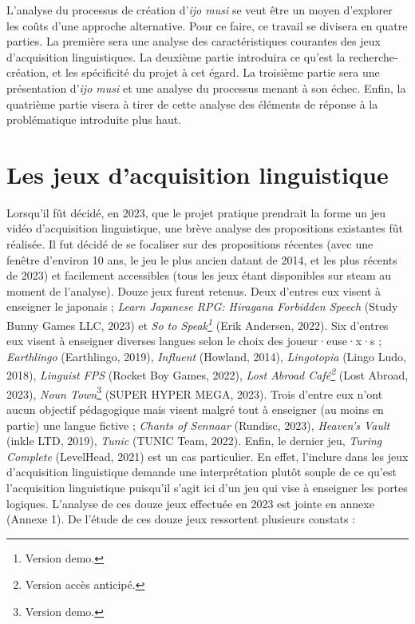 \documentclass{scrartcl}
\begin{document}
	L'analyse du processus de création d'\textit{ijo musi} se veut être un moyen d'explorer les coûts d'une approche alternative. Pour ce faire, ce travail se divisera en quatre parties. La première sera une analyse des caractéristiques courantes des jeux d'acquisition linguistiques. La deuxième partie introduira ce qu'est la recherche-création, et les spécificité du projet à cet égard. La troisième partie sera une présentation d'\textit{ijo musi} et une analyse du processus menant à son échec. Enfin, la quatrième partie visera à tirer de cette analyse des éléments de réponse à la problématique introduite plus haut.
	
	
	\section{Les jeux d'acquisition linguistique}
	Lorsqu'il fût décidé, en 2023, que le projet pratique prendrait la forme un jeu vidéo d'acquisition linguistique, une brève analyse des propositions existantes fût réalisée. Il fut décidé de se focaliser sur des propositions récentes (avec une fenêtre d'environ 10 ans, le jeu le plus ancien datant de 2014, et les plus récents de 2023) et facilement accessibles (tous les jeux étant disponibles sur steam au moment de l'analyse). Douze jeux furent retenus. Deux d'entres eux visent à enseigner le japonais ; \textit{Learn Japanese RPG: Hiragana Forbidden Speech} (Study Bunny Games LLC, 2023) et \textit{So to Speak\footnote{Version demo.}} (Erik Andersen, 2022). Six d'entres eux visent à enseigner diverses langues selon le choix des joueur·euse·x·s ; \textit{Earthlingo} (Earthlingo, 2019), \textit{Influent} (Howland, 2014), \textit{Lingotopia} (Lingo Ludo, 2018), \textit{Linguist FPS} (Rocket Boy Games, 2022), \textit{Lost Abroad Café\footnote{Version accès anticipé.}} (Lost Abroad, 2023), \textit{Noun Town}\footnote{Version demo.} (SUPER HYPER MEGA, 2023). Trois d'entre eux n'ont aucun objectif pédagogique mais visent malgré tout à enseigner (au moins en partie) une langue fictive ; \textit{Chants of Sennaar} (Rundisc, 2023), \textit{Heaven's Vault} (inkle LTD, 2019), \textit{Tunic} (TUNIC Team, 2022). Enfin, le dernier jeu, \textit{Turing Complete} (LevelHead, 2021) est un cas particulier. En effet, l'inclure dans les jeux d'acquisition linguistique demande une interprétation plutôt souple de ce qu'est l'acquisition linguistique puisqu'il s'agit ici d'un jeu qui vise à enseigner les portes logiques. L'analyse de ces douze jeux effectuée en 2023 est jointe en annexe (Annexe 1). De l'étude de ces douze jeux ressortent plusieurs constats :\\
\end{document}
